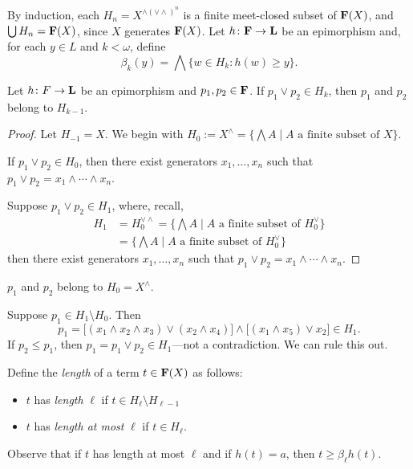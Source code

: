\bigskip
By induction, each $H_n = X^{\wedge(\vee\wedge)^n}$ is a finite meet-closed 
subset of $\mathbf{F}(X)$, and $\bigcup H_n = \mathbf{F}(X)$, since $X$  generates $\mathbf{F}(X)$.
Let $h \colon  \mathbf{F} \to \mathbf{L}$ be an epimorphism and, 
for each $y \in L$ and $k< \omega$, define
\[
\beta_k(y) = \bigwedge \{w \in H_k : h(w) \geqslant y\}.
\]

\begin{lemma}
  Let $h \colon \mathbf \alg{F} \to \mathbf L$ be an epimorphism and
  $p_1, p_2\in \mathbf{F}$. If $p_1\vee p_2 \in H_k$, then $p_1$ and $p_2$ belong to 
  $H_{k-1}$.
\end{lemma}
\begin{proof} Let $H_{-1} = X$.
We begin with  
$H_0 := X^\wedge = \{\bigwedge A \mid A \text{ a finite subset of } X\}$.

If $p_1 \vee p_2 \in H_0$, then there exist generators $x_1, \dots, x_n$ 
such that $p_1 \vee p_2 = x_1 \wedge \cdots \wedge x_n$.

Suppose $p_1 \vee p_2 \in H_1$, where, recall, 
\begin{align*}
H_1 &= H_0^{\vee \wedge} = \{\bigwedge A \mid A \text{ a finite subset of } H_0^{\vee}\} \\
 & = \{\bigwedge A \mid A \text{ a finite subset of } H_0^{\vee}\}
\end{align*}
then there exist generators $x_1, \dots, x_n$ such that 
$p_1 \vee p_2 = x_1 \wedge \cdots \wedge x_n$.
\end{proof}

\bigskip

 $p_1$ and $p_2$ belong to $H_0 = X^{\wedge}$.

\bigskip

 Suppose $p_1 \in H_1\setminus H_0$. Then 
\[
p_1 = \bigl[(x_1 \wedge x_2 \wedge x_3) \vee (x_2 \wedge x_4)\bigr] \wedge \bigl[(x_1 \wedge x_5)\vee x_2\bigr] \in H_1.
\]
If $p_2\leq p_1$, then $p_1 = p_1\vee p_2 \in H_1$---not a contradiction. We can rule this out.

\bigskip
{} 
Define the \emph{length} of a term $t \in \mathbf{F}(X)$ as follows:
\begin{itemize}
\item $t$ has \emph{length} $\ell$ if $t \in H_\ell \setminus H_{\ell-1}$
\item $t$ has \emph{length at most} $\ell$ if $t \in H_\ell$.
\end{itemize} 
Observe that if $t$ has length at most $\ell$ and if $h(t) = a$, then $t\geq \beta_\ell h (t)$.


